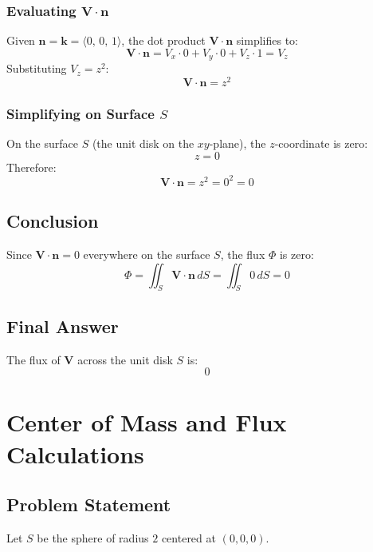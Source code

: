 \documentclass[11pt]{article}
\begin{document}
\subsubsection*{Evaluating \( \mathbf{V} \cdot \mathbf{n} \)}

Given \( \mathbf{n} = \mathbf{k} = \langle 0, \, 0, \, 1 \rangle \), the dot product \( \mathbf{V} \cdot \mathbf{n} \) simplifies to:
\[
\mathbf{V} \cdot \mathbf{n} = V_x \cdot 0 + V_y \cdot 0 + V_z \cdot 1 = V_z
\]
Substituting \( V_z = z^2 \):
\[
\mathbf{V} \cdot \mathbf{n} = z^2
\]

\subsubsection*{Simplifying on Surface \( S \)}

On the surface \( S \) (the unit disk on the \( xy \)-plane), the \( z \)-coordinate is zero:
\[
z = 0
\]
Therefore:
\[
\mathbf{V} \cdot \mathbf{n} = z^2 = 0^2 = 0
\]

\newpage

\subsection{Conclusion}

Since \( \mathbf{V} \cdot \mathbf{n} = 0 \) everywhere on the surface \( S \), the flux \( \Phi \) is zero:
\[
\Phi = \iint_{S} \mathbf{V} \cdot \mathbf{n} \, dS = \iint_{S} 0 \, dS = 0
\]

\newpage

\subsection{Final Answer}

The flux of \( \mathbf{V} \) across the unit disk \( S \) is:
\[
\boxed{0}
\]

\newpage

\section{Center of Mass and Flux Calculations}

\newpage

\subsection{Problem Statement}

Let \( S \) be the sphere of radius \( 2 \) centered at \( (0,0,0) \).
\end{document}
